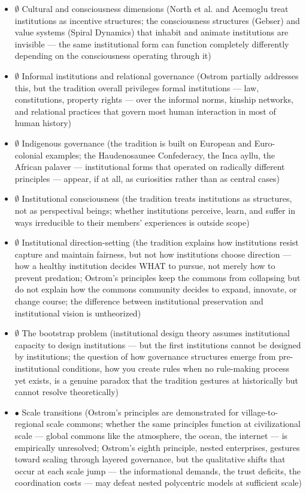 \begin{itemize}[nosep,leftmargin=*]
  \item $\emptyset$ Cultural and consciousness dimensions (North et al. and Acemoglu treat institutions as incentive structures; the consciousness structures (Gebser) and value systems (Spiral Dynamics) that inhabit and animate institutions are invisible — the same institutional form can function completely differently depending on the consciousness operating through it)
  \item $\emptyset$ Informal institutions and relational governance (Ostrom partially addresses this, but the tradition overall privileges formal institutions — law, constitutions, property rights — over the informal norms, kinship networks, and relational practices that govern most human interaction in most of human history)
  \item $\emptyset$ Indigenous governance (the tradition is built on European and Euro-colonial examples; the Haudenosaunee Confederacy, the Inca ayllu, the African palaver — institutional forms that operated on radically different principles — appear, if at all, as curiosities rather than as central cases)
  \item $\emptyset$ Institutional consciousness (the tradition treats institutions as structures, not as perspectival beings; whether institutions perceive, learn, and suffer in ways irreducible to their members' experiences is outside scope)
  \item $\emptyset$ Institutional direction-setting (the tradition explains how institutions resist capture and maintain fairness, but not how institutions choose direction — how a healthy institution decides WHAT to pursue, not merely how to prevent predation; Ostrom's principles keep the commons from collapsing but do not explain how the commons community decides to expand, innovate, or change course; the difference between institutional preservation and institutional vision is untheorized)
  \item $\emptyset$ The bootstrap problem (institutional design theory assumes institutional capacity to design institutions — but the first institutions cannot be designed by institutions; the question of how governance structures emerge from pre-institutional conditions, how you create rules when no rule-making process yet exists, is a genuine paradox that the tradition gestures at historically but cannot resolve theoretically)
  \item $\bullet$ Scale transitions (Ostrom's principles are demonstrated for village-to-regional scale commons; whether the same principles function at civilizational scale — global commons like the atmosphere, the ocean, the internet — is empirically unresolved; Ostrom's eighth principle, nested enterprises, gestures toward scaling through layered governance, but the qualitative shifts that occur at each scale jump — the informational demands, the trust deficits, the coordination costs — may defeat nested polycentric models at sufficient scale)

\end{itemize}
